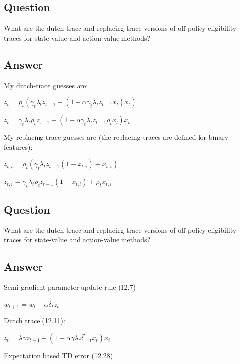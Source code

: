 \documentclass[11pt]{article}
\begin{document}
    \subsection{Question}

    What are the dutch-trace and replacing-trace versions of off-policy eligibility traces for state-value and action-value methods?

    \subsection*{Answer}

    \noindent My dutch-trace guesses are:

    \noindent $ z_t = \rho_{t} (\gamma_{t} \lambda_{t} z_{t-1} + (1-\alpha \gamma_t \lambda_t z_{t-1} x_t)x_t ) $

    \noindent $ z_t = \gamma_{t} \lambda_{t} \rho_{t} z_{t-1} + (1-\alpha \gamma_t \lambda_t z_{t-1} \rho_{t} x_t)x_t $

    \hfill \break
    \noindent My replacing-trace guesses are (the replacing traces are defined for binary features):

    \noindent $ z_{t,i} = \rho_{t} (\gamma_{t} \lambda_{t} z_{t-1} (1- x_{t,i}) + x_{t,i} ) $

    \noindent $ z_{t,i} = \gamma_{t} \lambda_{t} \rho_{t} z_{t-1} (1- x_{t,i}) + \rho_{t} x_{t,i} $

    \subsection{Question}

    What are the dutch-trace and replacing-trace versions of off-policy eligibility traces for state-value and action-value methods?

    \subsection*{Answer}

    \noindent Semi gradient parameter update rule (12.7)

    \noindent $ w_{t+1} = w_{t} + \alpha \delta_{t} z_{t} $

    \hfill \break
    \noindent Dutch trace (12.11):

    \noindent $ z_t = \lambda \gamma z_{t-1} + (1-\alpha \gamma \lambda z_{t-1}^{T} x_t) x_t $

    \hfill \break
    \noindent Expectation based TD error (12.28)
\end{document}
